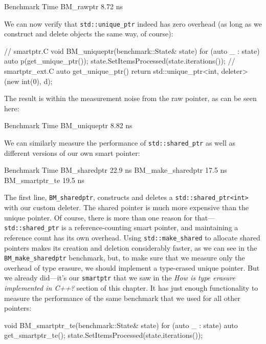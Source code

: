 {\begin{code}
Benchmark                      Time
BM_rawptr                   8.72 ns
\end{code}

We can now verify that \texttt{std::unique\_ptr} indeed has zero overhead (as long as we construct and delete objects the same way, of course):

\begin{code}
// smartptr.C
void BM_uniqueptr(benchmark::State& state) {
  for (auto _ : state) {
    auto p(get_unique_ptr());
  }
  state.SetItemsProcessed(state.iterations());
}
// smartptr_ext.C
auto get_unique_ptr() {
  return std::unique_ptr<int, deleter>(new int(0), d);
}
\end{code}

The result is within the measurement noise from the raw pointer, as can be seen here:

\begin{code}
Benchmark                      Time
BM_uniqueptr                8.82 ns
\end{code}

We can similarly measure the performance of \texttt{std::shared\_ptr} as well as different versions of our own smart pointer:

\begin{code}
Benchmark                      Time
BM_sharedptr                22.9 ns
BM_make_sharedptr           17.5 ns
BM_smartptr_te              19.5 ns
\end{code}

The first line, \texttt{BM\_sharedptr}, constructs and deletes a \texttt{std::shared\_ptr\textless{}int\textgreater{}} with our custom deleter. The shared pointer is much more expensive than the unique pointer. Of course, there is more than one reason for that---\texttt{std::shared\_ptr} is a reference-counting smart pointer, and maintaining a reference count has its own overhead. Using \texttt{std::make\_shared} to allocate shared pointers makes its creation and deletion considerably faster, as we can see in the \texttt{BM\_make\_sharedptr} benchmark, but, to make sure that we measure only the overhead of type erasure, we should implement a type-erased unique pointer. But we already did---it's our \texttt{smartptr} that we saw in the \emph{How is type erasure implemented in C++?} section of this chapter. It has just enough functionality to measure the performance of the same benchmark that we used for all other pointers:

\begin{code}
void BM_smartptr_te(benchmark::State& state) {
  for (auto _ : state) {
    auto get_smartptr_te();
  }
  state.SetItemsProcessed(state.iterations());
}
\end{code}

}
